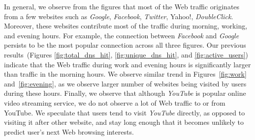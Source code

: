 \documentclass[letterpaper,twocolumn]{article}
\begin{document}
In general, we observe from the figures that most of the Web traffic originates from a few websites such as \textit{Google}, \textit{Facebook}, \textit{Twitter}, Yahoo!, \textit{DoubleClick}.
Moreover, these websites contribute most of the traffic during morning, working, and evening hours. 
For example, the connection between \textit{Facebook} and \textit{Google} persists to be the most popular connection across all three figures. 
Our previous results~(Figures \ref{fig:total_dns_hit}, \ref{fig:unique_dns_hit}, and \ref{fig:active_users}) indicate that the Web traffic during work and evening hours is significantly larger than traffic in the morning hours.
We observe similar trend in Figures~\ref{fig:work} and~\ref{fig:evening}, as we observe larger number of websites being visited by users during these hours.
Finally, we observe that although \textit{YouTube} is popular online video streaming service, we do not observe a lot of Web traffic to or from YouTube.
We speculate that users tend to visit \textit{YouTube} directly, as opposed to visiting it after other website, and stay long enough that it becomes unlikely to predict user's next Web browsing interests. 
\end{document}
